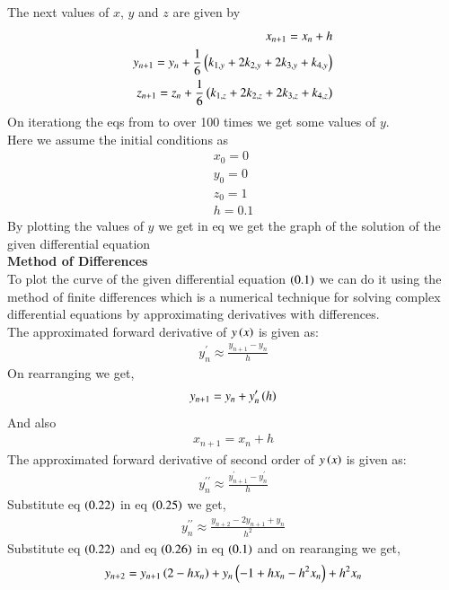\documentclass[journal]{IEEEtran}
\begin{document}
The next values of $x$, $y$ and $z$ are given by
\begin{align}
	x_{n+1}=x_n+h\\
    y_{n+1}= y_n + \frac{1}{6}\left(k_{1,y}+2k_{2,y}+2k_{3,y}+k_{4,y}\right)\\
    z_{n+1}= z_n + \frac{1}{6}\left(k_{1,z}+2k_{2,z}+2k_{3,z}+k_{4,z}\right)
\end{align}
On iterationg the eqs from  to  over 100 times we get some values of $y$.\\
Here we assume the initial conditions as
\begin{align}
    x_0=0\\y_0=0\\z_0=1\\h=0.1
\end{align}
By plotting the values of $y$ we get in eq  we get the graph of the solution of the given differential equation\\
\textbf{Method of Differences}\\
To plot the curve of the given differential equation $\left(0.1\right)$ we can do it using the method of finite differences which is a numerical technique for solving complex differential equations by approximating derivatives with differences.\\
The approximated forward derivative of $y\left(x\right)$ is given as:\\
\begin{align}
    y^\prime_n\approx\frac{y_{n+1}-y_n}{h}
\end{align}
On rearranging we get,
\begin{align}
    y_{n+1}=y_n+y^\prime_n\left(h\right)
\end{align}
And also 
\begin{align}
    x_{n+1}=x_n+h
\end{align}
The approximated forward derivative of second order of $y\left(x\right)$ is given as:\\
\begin{align}
    y^{\prime\prime}_n\approx \frac{y^\prime_{n+1}-y^\prime_n}{h}
\end{align}
Substitute eq $\left(0.22\right)$ in eq $\left(0.25\right)$ we get,
\begin{align}
    y^{\prime\prime}_n\approx\frac{y_{n+2}-2y_{n+1}+y_n}{h^2}
\end{align}
Substitute  eq $\left(0.22\right)$ and eq $\left(0.26\right)$ in eq $\left(0.1\right)$ and on rearanging we get,
\begin{align}
    y_{n+2}=y_{n+1}\left(2-hx_n\right) +y_n\left(-1+hx_n-h^2x_n\right)+h^2x_n
\end{align}
\end{document}
